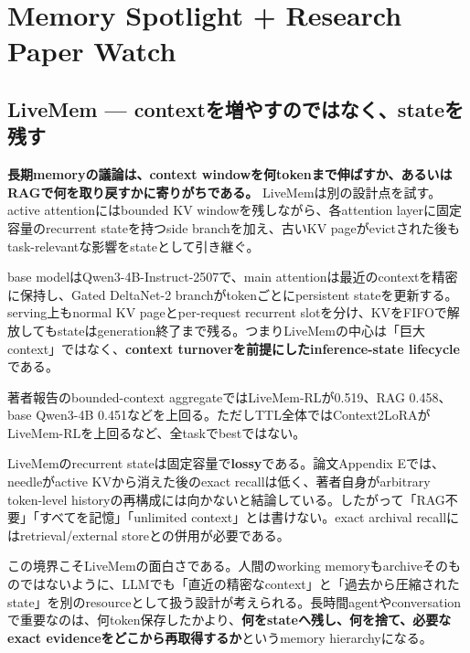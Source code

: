 \section{Memory Spotlight + Research Paper Watch}

\subsection*{LiveMem --- contextを増やすのではなく、stateを残す}

\textbf{長期memoryの議論は、context windowを何tokenまで伸ばすか、あるいはRAGで何を取り戻すかに寄りがちである。} LiveMemは別の設計点を試す。active attentionにはbounded KV windowを残しながら、各attention layerに固定容量のrecurrent stateを持つside branchを加え、古いKV pageがevictされた後もtask-relevantな影響をstateとして引き継ぐ\cite{livemem-paper}。

base modelはQwen3-4B-Instruct-2507で、main attentionは最近のcontextを精密に保持し、Gated DeltaNet-2 branchがtokenごとにpersistent stateを更新する。serving上もnormal KV pageとper-request recurrent slotを分け、KVをFIFOで解放してもstateはgeneration終了まで残る。つまりLiveMemの中心は「巨大context」ではなく、\textbf{context turnoverを前提にしたinference-state lifecycle}である\cite{livemem-paper}。

著者報告のbounded-context aggregateではLiveMem-RLが0.519、RAG 0.458、base Qwen3-4B 0.451などを上回る。ただしTTL全体ではContext2LoRAがLiveMem-RLを上回るなど、全taskでbestではない\cite{livemem-paper}。

\begin{claimboundary}
LiveMemのrecurrent stateは固定容量で\textbf{lossy}である。論文Appendix Eでは、needleがactive KVから消えた後のexact recallは低く、著者自身がarbitrary token-level historyの再構成には向かないと結論している。したがって「RAG不要」「すべてを記憶」「unlimited context」とは書けない。exact archival recallにはretrieval/external storeとの併用が必要である\cite{livemem-paper}。
\end{claimboundary}

この境界こそLiveMemの面白さである。人間のworking memoryもarchiveそのものではないように、LLMでも「直近の精密なcontext」と「過去から圧縮されたstate」を別のresourceとして扱う設計が考えられる。長時間agentやconversationで重要なのは、何token保存したかより、\textbf{何をstateへ残し、何を捨て、必要なexact evidenceをどこから再取得するか}というmemory hierarchyになる。

